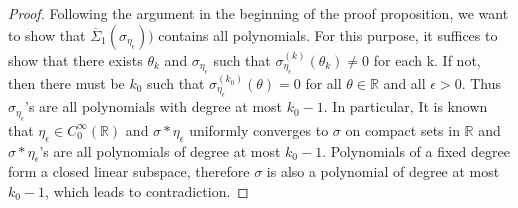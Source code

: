 \begin{proof}
Following the argument in the beginning of the proof proposition, we
want to show that $\overline{\Sigma}_1(\sigma_{\eta_\epsilon}))$
contains all polynomials.  For this purpose, it suffices to show that
there exists $\theta_k$ and $\sigma_{\eta_\epsilon}$ such that
$\sigma_{\eta_\epsilon}^{(k)}(\theta_k)\ne0$ for each k. If not, then
there must be $k_0$ such that
$\sigma_{\eta_\epsilon}^{(k_0)}(\theta)=0$ for all
$\theta\in\mathbb{R}$ and all $\epsilon>0$.  Thus
$\sigma_{\eta_\epsilon}$'s are all polynomials with degree at most
$k_0-1$.  In particular, It is known that $\eta_\epsilon\in
C_0^\infty(\mathbb{R})$ and $\sigma\ast\eta_\epsilon$ uniformly
converges to $\sigma$ on compact sets in $\mathbb{R}$ and
$\sigma\ast\eta_\epsilon$'s are all polynomials of degree at most
$k_0-1$. Polynomials of a fixed degree form a closed linear subspace,
therefore $\sigma$ is also a polynomial of degree at most $k_0-1$,
which leads to contradiction.
\end{proof}
